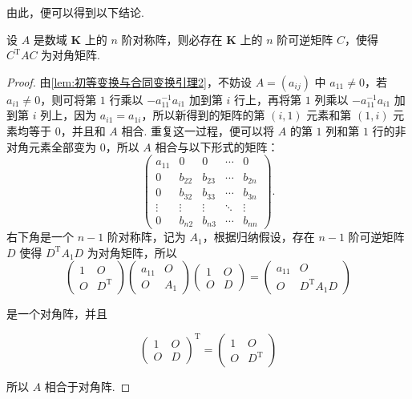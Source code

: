由此，便可以得到以下结论.

\begin{theorem}{}{}
    设 $A$ 是数域 $\mathbf{K}$ 上的 $n$ 阶对称阵，则必存在 $\mathbf{K}$ 上的 $n$ 阶可逆矩阵 $C$，使得 $C^\mathrm{T}AC$ 为对角矩阵.
\end{theorem}

\begin{proof}
    由\autoref{lem:初等变换与合同变换引理2}，不妨设 $A = (a_{ij})$ 中 $a_{11} \neq 0$，若 $a_{i1} \neq 0$，则可将第 $1$ 行乘以 $-a_{11}^{-1}a_{i1}$ 加到第 $i$ 行上，再将第 $1$ 列乘以 $-a_{11}^{-1}a_{i1}$ 加到第 $i$ 列上，因为 $a_{i1} = a_{1i}$，所以新得到的矩阵的第 $(i, 1)$ 元素和第 $(1, i)$ 元素均等于 $0$，并且和 $A$ 相合. 重复这一过程，便可以将 $A$ 的第 $1$ 列和第 $1$ 行的非对角元素全部变为 $0$，所以 $A$ 相合与以下形式的矩阵：
    \[
        \begin{pmatrix}
            a_{11} & 0 & 0 & \cdots & 0 \\
            0 & b_{22} & b_{23} & \cdots & b_{2n} \\
            0 & b_{32} & b_{33} & \cdots & b_{3n} \\
            \vdots & \vdots & \vdots & \ddots & \vdots \\
            0 & b_{n2} & b_{n3} & \cdots & b_{nn}
        \end{pmatrix}.
    \]
    右下角是一个 $n - 1$ 阶对称阵，记为 $A_1$，根据归纳假设，存在 $n - 1$ 阶可逆矩阵 $D$ 使得 $D^\mathrm{T}A_1D$ 为对角矩阵，所以
    \[
        \begin{pmatrix}
            1 & O \\
            O & D^\mathrm{T}
        \end{pmatrix}
        \begin{pmatrix}
            a_{11} & O \\
            O & A_1
        \end{pmatrix}
        \begin{pmatrix}
            1 & O \\
            O & D
        \end{pmatrix} = \begin{pmatrix}
            a_{11} & O \\
            O & D^\mathrm{T}A_1D
        \end{pmatrix}
    \]

    是一个对角阵，并且

    \[
        \begin{pmatrix}
            1 & O \\
            O & D
        \end{pmatrix}^\mathrm{T} = \begin{pmatrix}
            1 & O \\
            O & D^\mathrm{T}
        \end{pmatrix}
    \]

    所以 $A$ 相合于对角阵.
\end{proof}


